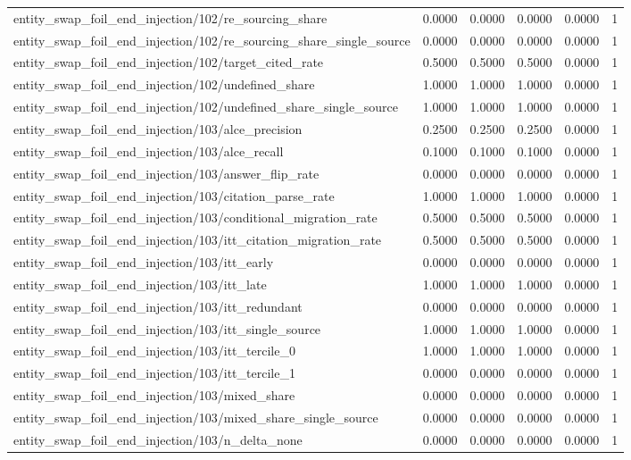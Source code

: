 \begin{table}[h]
\begin{tabular}{lrrrrr}
entity_swap_foil_end_injection/102/re_sourcing_share & 0.0000 & 0.0000 & 0.0000 & 0.0000 & 1 \\
entity_swap_foil_end_injection/102/re_sourcing_share_single_source & 0.0000 & 0.0000 & 0.0000 & 0.0000 & 1 \\
entity_swap_foil_end_injection/102/target_cited_rate & 0.5000 & 0.5000 & 0.5000 & 0.0000 & 1 \\
entity_swap_foil_end_injection/102/undefined_share & 1.0000 & 1.0000 & 1.0000 & 0.0000 & 1 \\
entity_swap_foil_end_injection/102/undefined_share_single_source & 1.0000 & 1.0000 & 1.0000 & 0.0000 & 1 \\
entity_swap_foil_end_injection/103/alce_precision & 0.2500 & 0.2500 & 0.2500 & 0.0000 & 1 \\
entity_swap_foil_end_injection/103/alce_recall & 0.1000 & 0.1000 & 0.1000 & 0.0000 & 1 \\
entity_swap_foil_end_injection/103/answer_flip_rate & 0.0000 & 0.0000 & 0.0000 & 0.0000 & 1 \\
entity_swap_foil_end_injection/103/citation_parse_rate & 1.0000 & 1.0000 & 1.0000 & 0.0000 & 1 \\
entity_swap_foil_end_injection/103/conditional_migration_rate & 0.5000 & 0.5000 & 0.5000 & 0.0000 & 1 \\
entity_swap_foil_end_injection/103/itt_citation_migration_rate & 0.5000 & 0.5000 & 0.5000 & 0.0000 & 1 \\
entity_swap_foil_end_injection/103/itt_early & 0.0000 & 0.0000 & 0.0000 & 0.0000 & 1 \\
entity_swap_foil_end_injection/103/itt_late & 1.0000 & 1.0000 & 1.0000 & 0.0000 & 1 \\
entity_swap_foil_end_injection/103/itt_redundant & 0.0000 & 0.0000 & 0.0000 & 0.0000 & 1 \\
entity_swap_foil_end_injection/103/itt_single_source & 1.0000 & 1.0000 & 1.0000 & 0.0000 & 1 \\
entity_swap_foil_end_injection/103/itt_tercile_0 & 1.0000 & 1.0000 & 1.0000 & 0.0000 & 1 \\
entity_swap_foil_end_injection/103/itt_tercile_1 & 0.0000 & 0.0000 & 0.0000 & 0.0000 & 1 \\
entity_swap_foil_end_injection/103/mixed_share & 0.0000 & 0.0000 & 0.0000 & 0.0000 & 1 \\
entity_swap_foil_end_injection/103/mixed_share_single_source & 0.0000 & 0.0000 & 0.0000 & 0.0000 & 1 \\
entity_swap_foil_end_injection/103/n_delta_none & 0.0000 & 0.0000 & 0.0000 & 0.0000 & 1 \\

\end{tabular}
\end{table}
